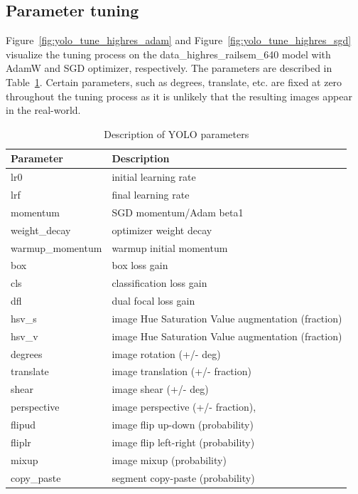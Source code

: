 \documentclass[Master,MDS,english]{BASE/twbook} %
\begin{document}
\subsection{Parameter tuning} \label{app:yolo_parameters}

Figure~\ref{fig:yolo_tune_highres_adam} and Figure~\ref{fig:yolo_tune_highres_sgd} visualize the tuning process on the data\_highres\_railsem\_640 model  with AdamW and SGD optimizer, respectively.
The parameters are described in Table~\ref{tab:yolo_parameters}. Certain parameters, such as degrees, translate, etc. are fixed at zero throughout the tuning process as it is unlikely that the resulting images appear in the real-world.


\begin{table}[h]
\footnotesize
\centering
\begin{tabular}{|l|l|}
\hline
\textbf{Parameter} & \textbf{Description} \\ \hline
lr0 & initial learning rate \\ 
lrf & final learning rate \\ 
momentum & SGD momentum/Adam beta1 \\ 
weight\_decay & optimizer weight decay \\ 
warmup\_momentum & warmup initial momentum \\ 
box & box loss gain \\ 
cls & classification loss gain \\ 
dfl & dual focal loss gain \\ 
hsv\_s & image Hue Saturation Value augmentation (fraction) \\ 
hsv\_v & image Hue Saturation Value augmentation (fraction) \\ 
degrees & image rotation (+/- deg) \\ 
translate & image translation (+/- fraction) \\ 
shear & image shear (+/- deg) \\ 
perspective & image perspective (+/- fraction),\\ 
flipud & image flip up-down (probability) \\ 
fliplr & image flip left-right (probability) \\ 
mixup & image mixup (probability) \\ 
copy\_paste & segment copy-paste (probability) \\ \hline
\end{tabular}
\caption{Description of YOLO parameters}
\label{tab:yolo_parameters}
\end{table}
\end{document}
